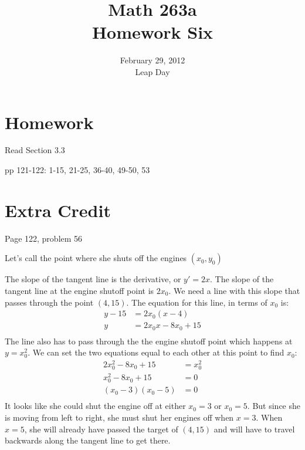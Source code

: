 \documentclass{exam}
\title{Math 263a \\ Homework Six}
\date{February 29, 2012 \\ Leap Day}
\begin{document}
\maketitle

\section{Homework}

\begin{itemize*}
  \item Read Section 3.3
  \item pp 121-122: 1-15, 21-25, 36-40, 49-50, 53
\end{itemize*}

\section{Extra Credit}

Page 122, problem 56

\ifprintanswers

Let's call the point where she shuts off the engines $(x_0, y_0)$

The slope of the tangent line is the derivative, or $y' = 2x$.  The slope of the tangent line at the engine shutoff
point is $2x_0$.  We need a line with this slope that passes through the point $(4, 15)$.  The equation for this line,
in terms of $x_0$ is:
\begin{align*}
  y - 15 &= 2x_0(x - 4) \\
  y &= 2x_0 x - 8x_0 + 15 \\
\end{align*}
The line also has to pass through the the engine shutoff point which happens at $y = x_0^2$.  We can set the two
equations equal to each other at this point to find $x_0$:
\begin{align*}
  2x_0^2 - 8x_0 + 15 &= x_0^2 \\
  x_0^2 - 8x_0 + 15 &= 0 \\
  (x_0 - 3)(x_0 - 5) &= 0 \\
\end{align*}
It looks like she could shut the engine off at either $x_0 = 3$ or $x_0 = 5$.  But since she is moving from left to right, she must shut her engines off when $x = 3$.  When $x = 5$, she will already have passed the target of $(4, 15)$ and will have to travel backwards along the tangent line to get there.
\end{document}
